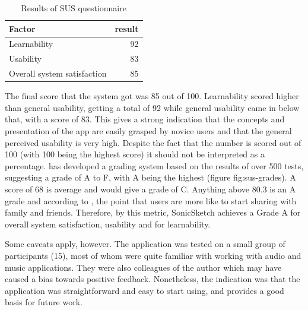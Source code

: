 \documentclass[12pt]{report}
\begin{document}
\begin{table}[htbp]
\caption{\label{tab:org3ede874}
Results of SUS questionnaire}
\centering
\begin{tabular}{lr}
Factor & result\\
\hline
Learnability & 92\\
Usability & 83\\
Overall system satisfaction & 85\\
\end{tabular}
\end{table}

The final score that the system got was 85 out of 100. Learnability scored
higher than general usability, getting a total of 92 while general usability
came in below that, with a score of 83. This gives a strong indication that the
concepts and presentation of the app are easily grasped by novice users and that
the general perceived usability is very high. Despite the fact that the number
is scored out of 100 (with 100 being the highest score) it should not be
interpreted as a percentage. \citet{sauro_measuringu:_2011} has developed a
grading system based on the results of over 500 tests, suggesting a grade of A
to F, with A being the highest (figure fig:sus-grades). A score of 68 is average
and would give a grade of C. Anything above 80.3 is an A grade and according to
\citet{sauro_measuringu:_2011}, the point that users are more like to start
sharing with family and friends. Therefore, by this metric, SonicSketch achieves
a Grade A for overall system satisfaction, usability and for learnability.

Some caveats apply, however. The application was tested on a small group of
participants (15), most of whom were quite familiar with working with audio and
music applications. They were also colleagues of the author which may have
caused a bias towards positive feedback. Nonetheless, the indication was that
the application was straightforward and easy to start using, and provides a good
basis for future work.
\end{document}
